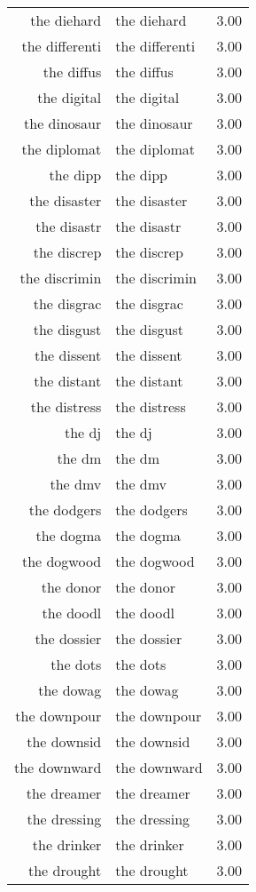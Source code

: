 \begin{table}[ht]
\begin{tabular}{rlr}
  the diehard & the diehard & 3.00 \\ 
  the differenti & the differenti & 3.00 \\ 
  the diffus & the diffus & 3.00 \\ 
  the digital & the digital & 3.00 \\ 
  the dinosaur & the dinosaur & 3.00 \\ 
  the diplomat & the diplomat & 3.00 \\ 
  the dipp & the dipp & 3.00 \\ 
  the disaster & the disaster & 3.00 \\ 
  the disastr & the disastr & 3.00 \\ 
  the discrep & the discrep & 3.00 \\ 
  the discrimin & the discrimin & 3.00 \\ 
  the disgrac & the disgrac & 3.00 \\ 
  the disgust & the disgust & 3.00 \\ 
  the dissent & the dissent & 3.00 \\ 
  the distant & the distant & 3.00 \\ 
  the distress & the distress & 3.00 \\ 
  the dj & the dj & 3.00 \\ 
  the dm & the dm & 3.00 \\ 
  the dmv & the dmv & 3.00 \\ 
  the dodgers & the dodgers & 3.00 \\ 
  the dogma & the dogma & 3.00 \\ 
  the dogwood & the dogwood & 3.00 \\ 
  the donor & the donor & 3.00 \\ 
  the doodl & the doodl & 3.00 \\ 
  the dossier & the dossier & 3.00 \\ 
  the dots & the dots & 3.00 \\ 
  the dowag & the dowag & 3.00 \\ 
  the downpour & the downpour & 3.00 \\ 
  the downsid & the downsid & 3.00 \\ 
  the downward & the downward & 3.00 \\ 
  the dreamer & the dreamer & 3.00 \\ 
  the dressing & the dressing & 3.00 \\ 
  the drinker & the drinker & 3.00 \\ 
  the drought & the drought & 3.00 \\ 

\end{tabular}
\end{table}
